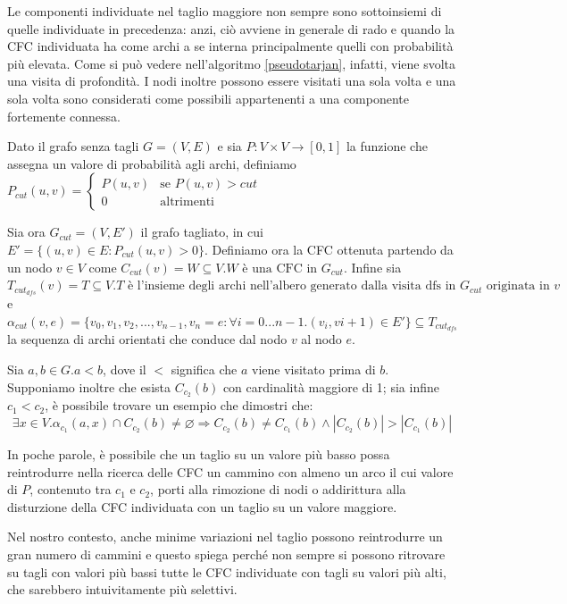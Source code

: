 \documentclass[10pt,a4paper]{article}
\begin{document}
Le componenti individuate nel taglio maggiore non sempre sono sottoinsiemi di quelle individuate in precedenza: anzi, ciò avviene in generale di rado e quando la CFC individuata ha come archi a se interna principalmente quelli con probabilità più elevata.
Come si può vedere nell'algoritmo \ref{pseudotarjan}, infatti, viene svolta una visita di profondità. I nodi inoltre possono essere visitati una sola volta e una sola volta sono considerati come possibili appartenenti a una componente fortemente connessa.

Dato il grafo senza tagli $G=(V,E)$ e sia $P:V \times V \to [0,1]$ la funzione che assegna un valore di probabilità agli archi, definiamo
$P_{cut}(u,v) =
\begin{cases}
P(u,v) & \text{se } P(u,v) > cut\\
0 	& \text{altrimenti}
\end{cases}$

Sia ora $G_{cut}=(V,E')$ il grafo tagliato, in cui $E' = \{(u,v) \in E : P_{cut}(u,v) > 0\}$. Definiamo ora la CFC ottenuta partendo da un nodo $v \in V$ come $C_{cut}( v ) = W \subseteq V. W \text{ è una CFC in } G_{cut} $. Infine sia $ T_{cut_{dfs}}(v) = T \subseteq V . T \text{ è l'insieme degli archi nell'albero generato dalla visita dfs in } G_{cut} \text{ originata in } v $ e $\alpha_{cut} (v, e) = \{ v_{0}, v_{1}, v_{2}, ... , v_{n-1}, v_{n} = e : \forall i = 0...n-1 . (v_{i}, v{i+1}) \in E' \}  \subseteq T_{cut_{dfs}}$ la sequenza di archi orientati che conduce dal nodo $v$ al nodo $e$.

Sia $a,b \in G . a < b$, dove il $<$ significa che $a$ viene visitato prima di $b$. Supponiamo inoltre che esista $C_{c_{2}}( b )$ con cardinalità maggiore di 1; sia infine $c_{1} < c_{2}$, è possibile trovare un esempio che dimostri che:
$$
\exists x \in V . \alpha_{c_{1}}(a, x) \cap C_{c_{2}}( b ) \neq  \varnothing \Rightarrow C_{c_{2}}(b) \neq C_{c_{1}}( b ) \land |C_{c_{2}}(b)| > |C_{c_{1}}(b)|
$$


In poche parole, è possibile che un taglio su un valore più basso possa reintrodurre nella ricerca delle CFC un cammino con almeno un arco il cui valore di $P$, contenuto tra $c_{1}$ e $c_{2}$, porti alla rimozione di nodi o addirittura alla disturzione della CFC individuata con un taglio su un valore maggiore. 

Nel nostro contesto, anche minime variazioni nel taglio possono reintrodurre un gran numero di cammini e questo spiega perché non sempre si possono ritrovare su tagli con valori più bassi tutte le CFC individuate con tagli su valori più alti, che sarebbero intuivitamente più selettivi.
\end{document}
